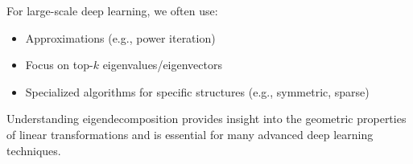 For large-scale deep learning, we often use:
\begin{itemize}
    \item Approximations (e.g., power iteration)
    \item Focus on top-$k$ eigenvalues/eigenvectors
    \item Specialized algorithms for specific structures (e.g., symmetric, sparse)
\end{itemize}

Understanding eigendecomposition provides insight into the geometric properties of linear transformations and is essential for many advanced deep learning techniques.
